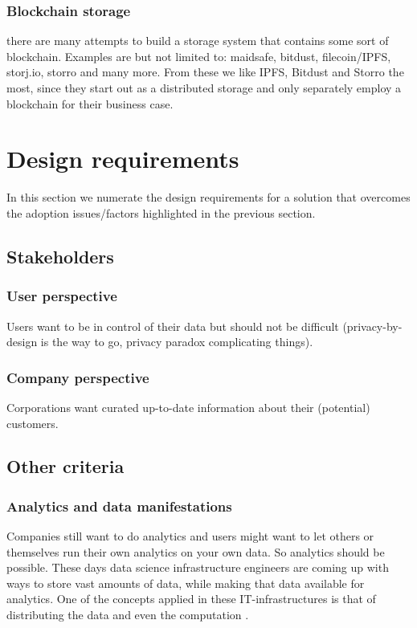\documentclass{article}
\begin{document}
\subsubsection{Blockchain storage}
there are many attempts to build a storage system that contains some sort of blockchain. Examples are but not limited to: maidsafe, bitdust, filecoin/IPFS, storj.io, storro and many more. From these we like IPFS, Bitdust and Storro the most, since they start out as a distributed storage and only separately employ a blockchain for their business case.

\section{Design requirements}
In this section we numerate the design requirements for a solution that overcomes the adoption issues/factors highlighted in the previous section.

\subsection{Stakeholders}
\subsubsection{User perspective}
Users want to be in control of their data but should not be difficult (privacy-by-design is the way to go, privacy paradox complicating things). 

\subsubsection{Company perspective}
Corporations want curated up-to-date information about their (potential) customers.

\subsection{Other criteria}
\subsubsection{Analytics and data manifestations}
Companies still want to do analytics and users might want to let others or themselves run their own analytics on your own data. So analytics should be possible. These days data science infrastructure engineers are coming up with ways to store vast amounts of data, while making that data available for analytics. One of the concepts applied in these IT-infrastructures is that of distributing the data and even the computation \cite{kleppmann2017designing}.
\end{document}
